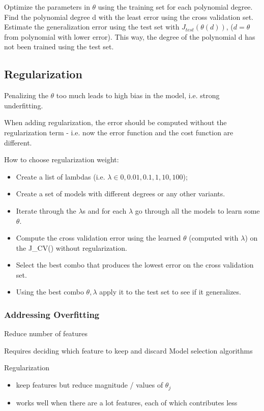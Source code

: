Optimize the parameters in $\theta$ using the training set for each polynomial degree.
Find the polynomial degree d with the least error using the cross validation set.
Estimate the generalization error using the test set with $J_{test}(\theta(d))$, ($d = \theta$ from polynomial with lower error). 
This way, the degree of the polynomial d has not been trained using the test set.

\subsection{Regularization}

Penalizing the $\theta$ too much leads to high bias in the model, i.e. strong underfitting. 

When adding regularization, the error should be computed without the regularization term - i.e. now the error function and the cost function are different.


How to choose regularization weight:
\begin{itemize}
\item Create a list of lambdas (i.e. $\lambda \in {0,0.01,0.1, 1, 10, 100}$);
\item Create a set of models with different degrees or any other variants.
\item Iterate through the $\lambda$s and for each $\lambda$ go through all the models to learn some $\theta$.
\item Compute the cross validation error using the learned $\theta$ (computed with $\lambda$) on the J_{CV}(\theta) without regularization.
\item Select the best combo that produces the lowest error on the cross validation set.
\item Using the best combo $\theta,\lambda$ apply it to the test set to see if it generalizes.
\end{itemize}

\subsubsection{Addressing Overfitting}

Reduce number of features

Requires deciding which feature to keep and discard
Model selection algorithms

Regularization

\begin{itemize}
\item keep features but reduce magnitude / values of $\theta_j$ 
\item works well when there are a lot features, each of which contributes less
\end{itemize}

